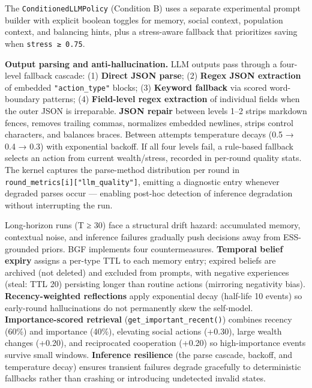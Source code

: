 The \texttt{ConditionedLLMPolicy} (Condition B) uses a separate experimental prompt builder with explicit boolean toggles for memory, social context, population context, and balancing hints, plus a stress-aware fallback that prioritizes saving when \texttt{stress ≥ 0.75}.

\textbf{Output parsing and anti-hallucination.} LLM outputs pass through a four-level fallback cascade: (1) \textbf{Direct JSON parse}; (2) \textbf{Regex JSON extraction} of embedded \texttt{"action\_type"} blocks; (3) \textbf{Keyword fallback} via scored word-boundary patterns; (4) \textbf{Field-level regex extraction} of individual fields when the outer JSON is irreparable. \textbf{JSON repair} between levels 1–2 strips markdown fences, removes trailing commas, normalizes embedded newlines, strips control characters, and balances braces. Between attempts temperature decays (0.5 → 0.4 → 0.3) with exponential backoff. If all four levels fail, a rule-based fallback selects an action from current wealth/stress, recorded in per-round quality stats. The kernel captures the parse-method distribution per round in \texttt{round\_metrics[i]["llm\_quality"]}, emitting a diagnostic entry whenever degraded parses occur — enabling post-hoc detection of inference degradation without interrupting the run.


Long-horizon runs (T ≥ 30) face a structural drift hazard: accumulated memory, contextual noise, and inference failures gradually push decisions away from ESS-grounded priors. BGF implements four countermeasures. \textbf{Temporal belief expiry} assigns a per-type TTL to each memory entry; expired beliefs are archived (not deleted) and excluded from prompts, with negative experiences (steal: TTL 20) persisting longer than routine actions (mirroring negativity bias). \textbf{Recency-weighted reflections} apply exponential decay (half-life 10 events) so early-round hallucinations do not permanently skew the self-model. \textbf{Importance-scored retrieval} (\texttt{get\_important\_recent()}) combines recency (60\%) and importance (40\%), elevating social actions (+0.30), large wealth changes (+0.20), and reciprocated cooperation (+0.20) so high-importance events survive small windows. \textbf{Inference resilience} (the parse cascade, backoff, and temperature decay) ensures transient failures degrade gracefully to deterministic fallbacks rather than crashing or introducing undetected invalid states.

